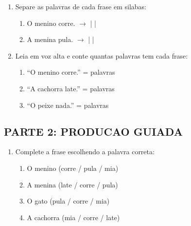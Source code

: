 \begin{exercicio}
\begin{enumerate}
  \item Separe as palavras de cada frase em silabas:
  \begin{enumerate}[label=\alph*)]
    \item O menino corre. $\rightarrow$ \underline{\hspace{1cm}} | \underline{\hspace{1cm}} \underline{\hspace{1cm}} \underline{\hspace{1cm}} | \underline{\hspace{1cm}} \underline{\hspace{1cm}}
    \item A menina pula. $\rightarrow$ \underline{\hspace{1cm}} | \underline{\hspace{1cm}} \underline{\hspace{1cm}} \underline{\hspace{1cm}} | \underline{\hspace{1cm}} \underline{\hspace{1cm}}
  \end{enumerate}

  \item Leia em voz alta e conte quantas palavras tem cada frase:
  \begin{enumerate}[label=\alph*)]
    \item ``O menino corre.'' = \underline{\hspace{0.5cm}} palavras
    \item ``A cachorra late.'' = \underline{\hspace{0.5cm}} palavras
    \item ``O peixe nada.'' = \underline{\hspace{0.5cm}} palavras
  \end{enumerate}
\end{enumerate}

\subsection*{PARTE 2: PRODUCAO GUIADA}

\begin{enumerate}[resume]
  \item Complete a frase escolhendo a palavra correta:
  \begin{enumerate}[label=\alph*)]
    \item O menino \underline{\hspace{3cm}} (corre / pula / mia)
    \item A menina \underline{\hspace{3cm}} (late / corre / pula)
    \item O gato \underline{\hspace{3cm}} (pula / corre / mia)
    \item A cachorra \underline{\hspace{3cm}} (mia / corre / late)
  \end{enumerate}


\end{enumerate}
\end{exercicio}
